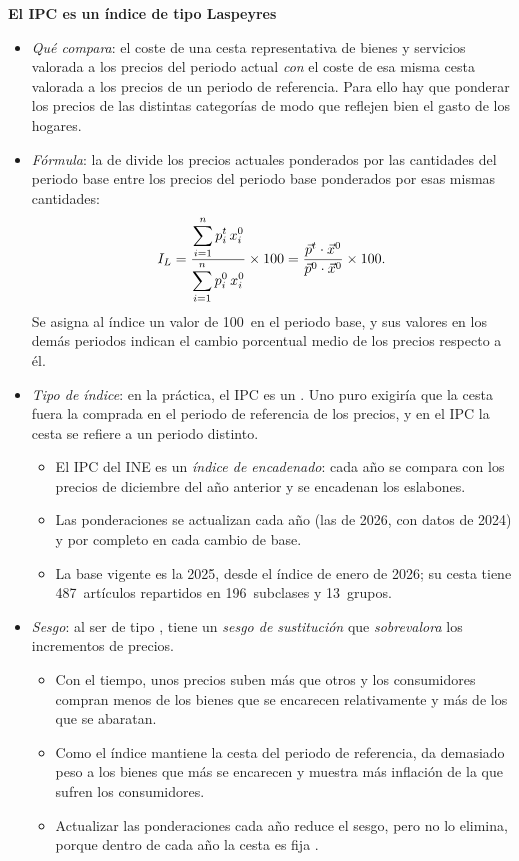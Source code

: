 \documentclass[11pt]{article}
\begin{document}
\begin{anotaciones}
\textbf{El IPC es un índice de tipo Laspeyres}\\
\begin{itemize}
\item \emph{Qué compara}: el coste de una cesta representativa de bienes y servicios valorada a los precios del periodo actual \emph{con} el coste de esa misma cesta valorada a los precios de un periodo de referencia. Para ello hay que ponderar los precios de las distintas categorías de modo que reflejen bien el gasto de los hogares.
\item \emph{Fórmula}: la de  divide los precios actuales ponderados por las cantidades del periodo base entre los precios del periodo base ponderados por esas mismas cantidades:
\begin{equation*}
I_L=\frac{\displaystyle\sum_{i=1}^{n}p_i^t\,x_i^0}{\displaystyle\sum_{i=1}^{n}p_i^0\,x_i^0}\times 100=\frac{\vec{p}^t\cdot\vec{x}^0}{\vec{p}^0\cdot\vec{x}^0}\times 100.
\end{equation*}
Se asigna al índice un valor de 100~en el periodo base, y sus valores en los demás periodos indican el cambio porcentual medio de los precios respecto a él.
\item \emph{Tipo de índice}: en la práctica, el IPC es un . Uno puro exigiría que la cesta fuera la comprada en el periodo de referencia de los precios, y en el IPC la cesta se refiere a un periodo distinto.
  \begin{itemize}
  \item El IPC del INE es un \emph{índice de  encadenado}: cada año se compara con los precios de diciembre del año anterior y se encadenan los eslabones.
  \item Las ponderaciones se actualizan cada año (las de 2026, con datos de 2024) y por completo en cada cambio de base\nocite{INE2026IPCMetodologia}.
  \item La base vigente es la 2025, desde el índice de enero de 2026\nocite{INE2026IPCMetodologia}; su cesta tiene 487~artículos repartidos en 196~subclases y 13~grupos\nocite{INE2026IPCPonderaciones,INE2026IPCNovedades}.
  \end{itemize}
\item \emph{Sesgo}: al ser de tipo , tiene un \emph{sesgo de sustitución} que \emph{sobrevalora} los incrementos de precios.
  \begin{itemize}
  \item Con el tiempo, unos precios suben más que otros y los consumidores compran menos de los bienes que se encarecen relativamente y más de los que se abaratan.
  \item Como el índice mantiene la cesta del periodo de referencia, da demasiado peso a los bienes que más se encarecen y muestra más inflación de la que sufren los consumidores.
  \item Actualizar las ponderaciones cada año reduce el sesgo, pero no lo elimina, porque dentro de cada año la cesta es fija .
  \end{itemize}
\end{itemize}
\end{anotaciones}
\end{document}

